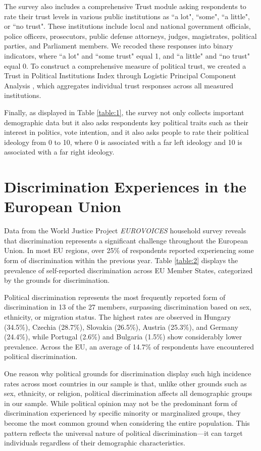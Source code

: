 \documentclass{article}
\begin{document}
The survey also includes a comprehensive Trust module asking respondents to rate their trust levels in various public institutions as ``a lot", ``some", ``a little", or ``no trust". These institutions include local and national government officials, police officers, prosecutors, public defense attorneys, judges, magistrates, political parties, and Parliament members. We recoded these responses into binary indicators, where ``a lot" and ``some trust" equal 1, and ``a little" and ``no trust" equal 0. To construct a comprehensive measure of political trust, we created a Trust in Political Institutions Index through Logistic Principal Component Analysis \parencite{landgraf_dimensionality_2020}, which aggregates individual trust responses across all measured institutions.

Finally, as displayed in Table \ref{table:1}, the survey not only collects important demographic data but it also asks respondents key political traits such as their interest in politics, vote intention, and it also asks people to rate their political ideology from 0 to 10, where 0 is associated with a far left ideology and 10 is associated with a far right ideology.

\section{Discrimination Experiences in the European Union}

Data from the World Justice Project \emph{EUROVOICES} household survey reveals that discrimination represents a significant challenge throughout the European Union. In most EU regions, over 25\% of respondents reported experiencing some form of discrimination within the previous year. Table \ref{table:2} displays the prevalence of self-reported discrimination across EU Member States, categorized by the grounds for discrimination.

Political discrimination represents the most frequently reported form of discrimination in 13 of the 27 members, surpassing discrimination based on sex, ethnicity, or migration status. The highest rates are observed in Hungary (34.5\%), Czechia (28.7\%), Slovakia (26.5\%), Austria (25.3\%), and Germany (24.4\%), while Portugal (2.6\%) and Bulgaria (1.5\%) show considerably lower prevalence. Across the EU, an average of 14.7\% of respondents have encountered political discrimination.

One reason why political grounds for discrimination display such high incidence rates across most countries in our sample is that, unlike other grounds such as sex, ethnicity, or religion, political discrimination affects all demographic groups in our sample. While political opinion may not be the predominant form of discrimination experienced by specific minority or marginalized groups, they become the most common ground when considering the entire population. This pattern reflects the universal nature of political discrimination—it can target individuals regardless of their demographic characteristics.
\end{document}
